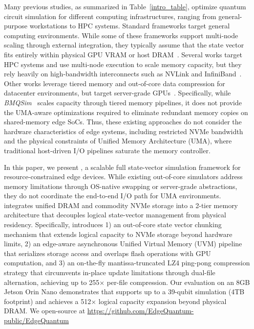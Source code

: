 Many previous studies, as summarized in Table~\ref{intro_table}, optimize quantum circuit simulation for different computing infrastructures, ranging from general-purpose workstations to HPC systems. Standard frameworks target general computing environments. While some of these frameworks support multi-node scaling through external integration, they typically assume that the state vector fits entirely within physical GPU VRAM or host DRAM~\cite{cirq, qiskit_aer, qsim, bayraktar2023cuquantum, pennylane}. Several works target HPC systems and use multi-node execution to scale memory capacity, but they rely heavily on high-bandwidth interconnects such as NVLink and InfiniBand~\cite{xu2024atlas, 10.1145/3771577, zhang2021hyquas}. Other works leverage tiered memory and out-of-core data compression for datacenter environments, but target server-grade GPUs~\cite{park2022snuqs, zhang2025bmqsim}. Specifically, while \textit{BMQSim}~\cite{zhang2025bmqsim} scales capacity through tiered memory pipelines, it does not provide the UMA-aware optimizations required to eliminate redundant memory copies on shared-memory edge SoCs. Thus, these existing approaches do not consider the hardware characteristics of edge systems, including restricted NVMe bandwidth and the physical constraints of Unified Memory Architecture (UMA), where traditional host-driven I/O pipelines saturate the memory controller.


In this paper, we present \EdgeQuantum, a scalable full state-vector simulation framework for resource-constrained edge devices. While existing out-of-core simulators address memory limitations through OS-native swapping or server-grade abstractions, they do not coordinate the end-to-end I/O path for UMA environments. \EdgeQuantum integrates unified DRAM and commodity NVMe storage into a 2-tier memory architecture that decouples logical state-vector management from physical residency. Specifically, \EdgeQuantum introduces 1) an out-of-core state vector chunking mechanism that extends logical capacity to NVMe storage beyond hardware limits, 2) an edge-aware asynchronous Unified Virtual Memory (UVM) pipeline that serializes storage access and overlaps flash operations with GPU computation, and 3) an on-the-fly mantissa-truncated LZ4 ping-pong compression strategy that circumvents in-place update limitations through dual-file alternation, achieving up to 255$\times$ per-file compression. Our evaluation on an 8GB Jetson Orin Nano demonstrates that \EdgeQuantum supports up to a 39-qubit simulation (4TB footprint) and achieves a 512$\times$ logical capacity expansion beyond physical DRAM. We open-source \EdgeQuantum at \url{https://github.com/EdgeQuantum-public/EdgeQuantum}





